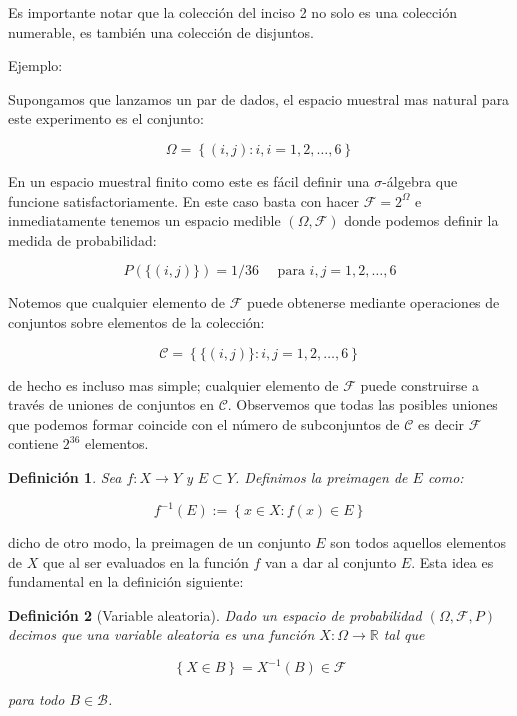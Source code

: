 \documentclass{extreport}
\theoremstyle{definicion}
\newtheorem{definition}{Definición}[chapter]
\theoremstyle{propiedad}
\begin{document}
Es importante notar que la colección del inciso 2 no solo es una colección numerable, es también una colección de disjuntos. 

Ejemplo:

Supongamos que lanzamos un par de dados, el espacio muestral mas natural para este experimento es el conjunto:

$$
\Omega = \left\{(i,j): i, i = 1,2,\ldots, 6\right\}
$$


En un espacio muestral finito como este es fácil definir una $\sigma$-álgebra que funcione satisfactoriamente. En este caso basta con hacer $\mathcal{F}= 2^\Omega$ e inmediatamente tenemos un espacio medible $(\Omega, \mathcal{F})$ donde podemos definir la medida de probabilidad:

$$
P(\{(i,j)\}) = 1/36\quad \text{ para } i,j= 1,2,\ldots, 6 
$$

Notemos que cualquier elemento de $\mathcal{F}$ puede obtenerse mediante operaciones de conjuntos sobre  elementos de la colección:

$$
\mathcal{C} = \left\{\{(i,j)\}: i,j= 1,2,\ldots,6\right\}
$$

de hecho es incluso mas simple; cualquier elemento de $\mathcal{F}$ puede construirse a través de uniones de conjuntos en $\mathcal{C}$. Observemos que todas las posibles uniones que podemos formar coincide con el número de subconjuntos de $\mathcal{C}$ es decir $\mathcal{F}$  contiene $2^{36}$ elementos.

\begin{definition}
Sea $f:X\rightarrow Y$ y $E\subset Y$. Definimos la \emph{preimagen}  de $E$ como:

$$
f^{-1}(E) := \left\{x\in X: f(x) \in E\right\}
$$    
\end{definition}
\par\noindent
dicho de otro modo, la preimagen de un conjunto $E$  son todos aquellos elementos de $X$  que al ser evaluados en la función $f$  van a dar al conjunto $E.$ Esta idea es fundamental en la definición siguiente: 

\begin{definition}[Variable aleatoria]
Dado un espacio de probabilidad $(\Omega, \mathcal{F}, P)$  decimos que una \emph{variable aleatoria} es una función $X:\Omega \rightarrow \mathbb{R}$ tal que 

$$
\left\{X \in B\right\} = X^{-1}(B)\in \mathcal{F}
$$

para todo $B\in \mathcal{B}$. 
    
\end{definition}
\end{document}

